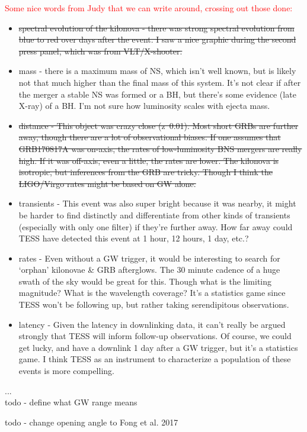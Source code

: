 \documentclass[modern]{aastex61}
\newcommand{\red}[1]{\textcolor{red}{#1}}
\begin{document}
\red{Some nice words from Judy that we can write around, crossing out those done:}
\begin{itemize}
\item \sout{spectral evolution of the kilonova - there was strong spectral evolution from blue to red over days after the event.  I saw a nice graphic during the second press panel, which was from VLT/X-shooter. }
\item mass - there is a maximum mass of NS, which isn’t well known, but is likely not that much higher than the final mass of this system.  It’s not clear if after the merger a stable NS was formed or a BH, but there’s some evidence (late X-ray) of a BH.  I’m not sure how luminosity scales with ejecta mass.
\item \sout{distance - This object was crazy close (z~0.01).  Most short GRBs are further away, though there are a lot of observational biases.  If one assumes that GRB170817A was on-axis, the rates of low-luminosity BNS mergers are really high.  If it was off-axis, even a little, the rates are lower.  The kilonova is isotropic, but inferences from the GRB are tricky.  Though I think the LIGO/Virgo rates might be based on GW alone.}
\item transients - This event was also super bright because it was nearby, it might be harder to find distinctly and differentiate from other kinds of transients (especially with only one filter) if they’re further away.  How far away could TESS have detected this event at 1 hour, 12 hours, 1 day, etc.?
\item rates - Even without a GW trigger, it would be interesting to search for ‘orphan’ kilonovae \& GRB afterglows.  The 30 minute cadence of a huge swath of the sky would be great for this.  Though what is the limiting magnitude?  What is the wavelength coverage?  It’s a statistics game since TESS won’t be following up, but rather taking serendipitous observations. 
\item latency - Given the latency in downlinking data, it can’t really be argued strongly that TESS will inform follow-up observations.  Of course, we could get lucky, and have a downlink 1 day after a GW trigger, but it’s a statistics game.  I think TESS as an instrument to characterize a population of these events is more compelling. 
\end{itemize}
...\\
todo - define what GW range means

todo - change opening angle to Fong et al. 2017
\end{document}
